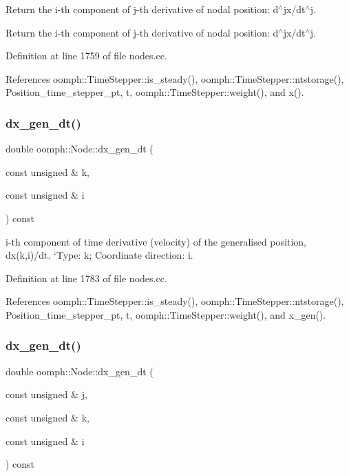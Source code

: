 Return the i-\/th component of j-\/th derivative of nodal position\+: d$^\wedge$jx/dt$^\wedge$j. 

Return the i-\/th component of j-\/th derivative of nodal position\+: d$^\wedge$jx/dt$^\wedge$j. 

Definition at line 1759 of file nodes.\+cc.



References oomph\+::\+Time\+Stepper\+::is\+\_\+steady(), oomph\+::\+Time\+Stepper\+::ntstorage(), Position\+\_\+time\+\_\+stepper\+\_\+pt, t, oomph\+::\+Time\+Stepper\+::weight(), and x().

\mbox{\label{classoomph_1_1Node_a03ddcfc8146b7b54f2a3ee5fdf00fa3b}} 
\subsubsection{\texorpdfstring{dx\+\_\+gen\+\_\+dt()}{dx\_gen\_dt()}\hspace{0.1cm}{\footnotesize\ttfamily [1/2]}}
{\footnotesize\ttfamily double oomph\+::\+Node\+::dx\+\_\+gen\+\_\+dt (\begin{DoxyParamCaption}\item[{const unsigned \&}]{k,  }\item[{const unsigned \&}]{i }\end{DoxyParamCaption}) const}



i-\/th component of time derivative (velocity) of the generalised position, dx(k,i)/dt. `\+Type\textquotesingle{}\+: k; Coordinate direction\+: i. 



Definition at line 1783 of file nodes.\+cc.



References oomph\+::\+Time\+Stepper\+::is\+\_\+steady(), oomph\+::\+Time\+Stepper\+::ntstorage(), Position\+\_\+time\+\_\+stepper\+\_\+pt, t, oomph\+::\+Time\+Stepper\+::weight(), and x\+\_\+gen().

\mbox{\label{classoomph_1_1Node_af9f1c9522857a0cb5ee04ef111865be2}} 
\subsubsection{\texorpdfstring{dx\+\_\+gen\+\_\+dt()}{dx\_gen\_dt()}\hspace{0.1cm}{\footnotesize\ttfamily [2/2]}}
{\footnotesize\ttfamily double oomph\+::\+Node\+::dx\+\_\+gen\+\_\+dt (\begin{DoxyParamCaption}\item[{const unsigned \&}]{j,  }\item[{const unsigned \&}]{k,  }\item[{const unsigned \&}]{i }\end{DoxyParamCaption}) const}



